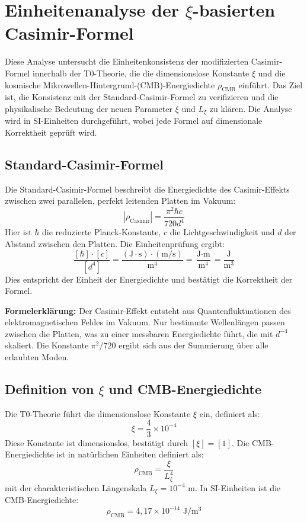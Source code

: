 	\section{Einheitenanalyse der $\xi$-basierten Casimir-Formel}
	
	Diese Analyse untersucht die Einheitenkonsistenz der modifizierten Casimir-Formel innerhalb der T0-Theorie, die die dimensionslose Konstante $\xi$ und die kosmische Mikrowellen-Hintergrund-(CMB)-Energiedichte $\rho_{\text{CMB}}$ einführt. Das Ziel ist, die Konsistenz mit der Standard-Casimir-Formel zu verifizieren und die physikalische Bedeutung der neuen Parameter $\xi$ und $L_\xi$ zu klären. Die Analyse wird in SI-Einheiten durchgeführt, wobei jede Formel auf dimensionale Korrektheit geprüft wird.
	
	\subsection{Standard-Casimir-Formel}
	Die Standard-Casimir-Formel beschreibt die Energiedichte des Casimir-Effekts zwischen zwei parallelen, perfekt leitenden Platten im Vakuum:
	\begin{equation}
		|\rho_{\text{Casimir}}| = \frac{\pi^2 \hbar c}{720 d^4}
	\end{equation}
	Hier ist $\hbar$ die reduzierte Planck-Konstante, $c$ die Lichtgeschwindigkeit und $d$ der Abstand zwischen den Platten. Die Einheitenprüfung ergibt:
	\begin{equation}
		\frac{[\hbar] \cdot [c]}{[d^4]} = \frac{(\text{J} \cdot \text{s}) \cdot (\text{m}/\text{s})}{\text{m}^4} = \frac{\text{J} \cdot \text{m}}{\text{m}^4} = \frac{\text{J}}{\text{m}^3}
	\end{equation}
	Dies entspricht der Einheit der Energiedichte und bestätigt die Korrektheit der Formel.
	
	\textbf{Formelerklärung:} Der Casimir-Effekt entsteht aus Quantenfluktuationen des elektromagnetischen Feldes im Vakuum. Nur bestimmte Wellenlängen passen zwischen die Platten, was zu einer messbaren Energiedichte führt, die mit $d^{-4}$ skaliert. Die Konstante $\pi^2/720$ ergibt sich aus der Summierung über alle erlaubten Moden.
	
	\subsection{Definition von $\xi$ und CMB-Energiedichte}
	Die T0-Theorie führt die dimensionslose Konstante $\xi$ ein, definiert als:
	\begin{equation}
		\xi = \frac{4}{3} \times 10^{-4}
	\end{equation}
	Diese Konstante ist dimensionslos, bestätigt durch $[\xi] = [1]$. Die CMB-Energiedichte ist in natürlichen Einheiten definiert als:
	\begin{equation}
		\rho_{\text{CMB}} = \frac{\xi}{L_\xi^4}
	\end{equation}
	mit der charakteristischen Längenskala $L_\xi = 10^{-4}$ m. In SI-Einheiten ist die CMB-Energiedichte:
	\begin{equation}
		\rho_{\text{CMB}} = 4,17 \times 10^{-14} \text{ J}/\text{m}^3
	\end{equation}
	

